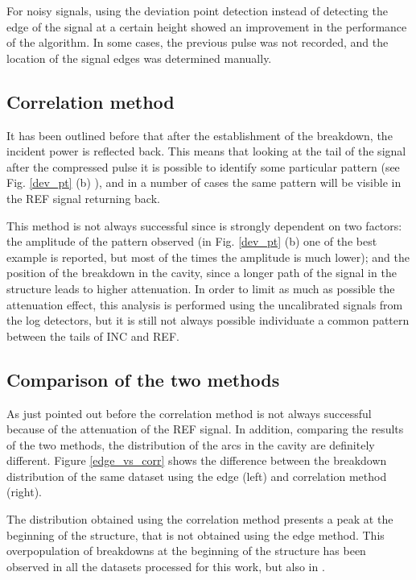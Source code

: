 For noisy signals, using the deviation point detection instead of detecting the edge of the signal at a certain height showed an improvement in the performance of the algorithm. In some cases, the previous pulse was not recorded, and the location of the signal edges was determined manually.

\subsection[Correlation method]{Correlation method}

It has been outlined before that after the establishment of the breakdown, the incident power is reflected back. This means that looking at the tail of the signal after the compressed pulse it is possible to identify some particular pattern (see Fig. \ref{dev_pt} (b) ), and in a number of cases the same pattern will be visible in the REF signal returning back. 

This method is not always successful since is strongly dependent on two factors: the amplitude of the pattern observed (in Fig. \ref{dev_pt} (b) one of the best example is reported, but most of the times the amplitude is much lower); and the position of the breakdown in the cavity, since a longer path of the signal in the structure leads to higher attenuation. In order to limit as much as possible the attenuation effect, this analysis is performed using the uncalibrated signals from the log detectors, but it is still not always possible individuate a common pattern between the tails of INC and REF.


\subsection[Comparison of the two methods]{Comparison of the two methods} 
As just pointed out before the correlation method is not always successful because of the attenuation of the REF signal. In addition, comparing the results of the two methods, the distribution of the arcs in the cavity are definitely different. Figure \ref{edge_vs_corr} shows the difference between the breakdown distribution of the same dataset using the edge (left) and correlation method (right). 

The distribution obtained using the correlation method presents a peak at the beginning of the structure, that is not obtained using the edge method. This overpopulation of breakdowns at the beginning of the structure has been observed in all the datasets processed for this work, but also in \cite{Rajamaki:2143815}.  

